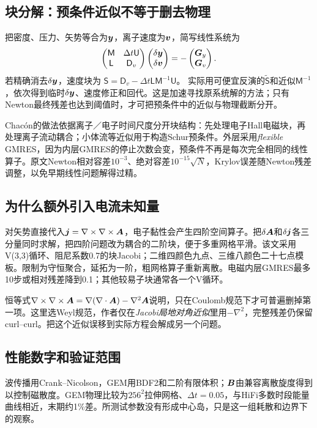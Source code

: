 \subsection{块分解：预条件近似不等于删去物理}
把密度、压力、矢势等合为$\bm{y}$，离子速度为$\bm{v}$，简写线性系统为
\begin{equation}
 \begin{pmatrix}\mathsf M&\Delta t\mathsf U\\
 \mathsf L&\mathsf D_v\end{pmatrix}
 \begin{pmatrix}\delta\bm{y}\\\delta\bm{v}\end{pmatrix}
 =-\begin{pmatrix}\bm{G}_y\\\bm{G}_v\end{pmatrix}.
\end{equation}
若精确消去$\delta\bm{y}$，速度块为
$\mathsf S=\mathsf D_v-\Delta t\mathsf L\mathsf M^{-1}\mathsf U$。
实际用可便宜反演的$\widetilde{\mathsf S}$和近似$\mathsf M^{-1}$，依次得到临时$\delta\bm{y}$、速度修正和回代。这是加速寻找原系统解的方法；只有Newton最终残差也达到阈值时，才可把预条件中的近似与物理截断分开。

Chacón的做法依据离子／电子时间尺度分开块结构：先处理电子Hall电磁块，再处理离子流动耦合；小体流等近似用于构造Schur预条件。外层采用\emph{flexible} GMRES，因为内层GMRES的停止次数会变，预条件不再是每次完全相同的线性算子。原文Newton相对容差$10^{-3}$、绝对容差$10^{-15}\sqrt N$，Krylov误差随Newton残差调整，以免早期线性问题解得过精。

\subsection{为什么额外引入电流未知量}
对矢势直接代入$\bm{j}=\nabla\times\nabla\times\bm{A}$，电子黏性会产生四阶空间算子。把$\delta\bm{A}$和$\delta\bm{j}$各三分量同时求解，把四阶问题改为耦合的二阶块，便于多重网格平滑。该文采用V(3,3)循环、阻尼系数0.7的块Jacobi；二维四颜色九点、三维八颜色二十七点模板。限制为守恒聚合，延拓为一阶，粗网格算子重新离散。电磁内层GMRES最多10步或相对残差降到0.1；其他较易子块通常各一个V循环。

恒等式$\nabla\times\nabla\times\bm{A}=\nabla(\nabla\cdot\bm{A})-\nabla^2\bm{A}$说明，只在Coulomb规范下才可普遍删掉第一项。这里选Weyl规范，作者仅在\emph{Jacobi局地对角近似}里用$-\nabla^2$，完整残差仍保留curl--curl。把这个近似误移到实际方程会解成另一个问题。

\subsection{性能数字和验证范围}
波传播用Crank--Nicolson，GEM用BDF2和二阶有限体积；$\bm{B}$由兼容离散旋度得到以控制磁散度。GEM物理比较为$256^2$拉伸网格、$\Delta t=0.05$，与HiFi多数时段能量曲线相近，末期约1\%差。所测试参数没有形成中心岛，只是这一组耗散和边界下的观察。

